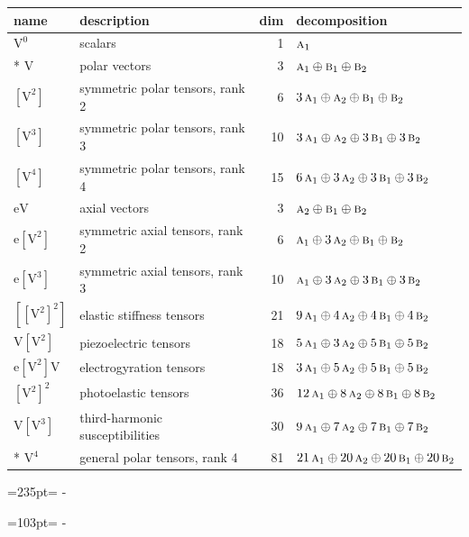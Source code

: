 \documentclass[10pt,a4paper]{article}
\newcommand{\needspace}[1]{\par\penalty-100\begingroup\dimen0=#1\relax\dimen2=\pagegoal
  \advance\dimen2-\pagetotal\ifdim\dimen0>\dimen2\relax\ifdim\dimen2>0pt\vfil\break\fi\fi
  \endgroup}
\numberwithin{equation}{section}
\newcommand{\irr}[1]{\text{\normalfont\scshape #1}}
\newcommand{\jahn}[1]{\mathrm{#1}}
\newlength{\fillwidth}\newlength{\cellwidth}\newlength{\colwidth}
\begin{document}
{\begin{longtable}{@{}llr>{\RaggedRight\arraybackslash}p{\fillwidth}@{}}
name & description & dim & decomposition\\\midrule\endhead
\bottomrule\endfoot\endlastfoot
$\jahn{V^{0}}$ & scalars & 1 & $\irr{a}_{1}$\\*
$\jahn{V}$ & polar vectors & 3 & $\irr{a}_{1} \oplus\allowbreak \irr{b}_{1} \oplus\allowbreak \irr{b}_{2}$\\
$\jahn{[V^{2}]}$ & symmetric polar tensors, rank 2 & 6 & $3\,\irr{a}_{1} \oplus\allowbreak \irr{a}_{2} \oplus\allowbreak \irr{b}_{1} \oplus\allowbreak \irr{b}_{2}$\\
$\jahn{[V^{3}]}$ & symmetric polar tensors, rank 3 & 10 & $3\,\irr{a}_{1} \oplus\allowbreak \irr{a}_{2} \oplus\allowbreak 3\,\irr{b}_{1} \oplus\allowbreak 3\,\irr{b}_{2}$\\
$\jahn{[V^{4}]}$ & symmetric polar tensors, rank 4 & 15 & $6\,\irr{a}_{1} \oplus\allowbreak 3\,\irr{a}_{2} \oplus\allowbreak 3\,\irr{b}_{1} \oplus\allowbreak 3\,\irr{b}_{2}$\\
$\jahn{eV}$ & axial vectors & 3 & $\irr{a}_{2} \oplus\allowbreak \irr{b}_{1} \oplus\allowbreak \irr{b}_{2}$\\
$\jahn{e[V^{2}]}$ & symmetric axial tensors, rank 2 & 6 & $\irr{a}_{1} \oplus\allowbreak 3\,\irr{a}_{2} \oplus\allowbreak \irr{b}_{1} \oplus\allowbreak \irr{b}_{2}$\\
$\jahn{e[V^{3}]}$ & symmetric axial tensors, rank 3 & 10 & $\irr{a}_{1} \oplus\allowbreak 3\,\irr{a}_{2} \oplus\allowbreak 3\,\irr{b}_{1} \oplus\allowbreak 3\,\irr{b}_{2}$\\
$\jahn{[[V^{2}]^{2}]}$ & elastic stiffness tensors & 21 & $9\,\irr{a}_{1} \oplus\allowbreak 4\,\irr{a}_{2} \oplus\allowbreak 4\,\irr{b}_{1} \oplus\allowbreak 4\,\irr{b}_{2}$\\
$\jahn{V[V^{2}]}$ & piezoelectric tensors & 18 & $5\,\irr{a}_{1} \oplus\allowbreak 3\,\irr{a}_{2} \oplus\allowbreak 5\,\irr{b}_{1} \oplus\allowbreak 5\,\irr{b}_{2}$\\
$\jahn{e[V^{2}]V}$ & electrogyration tensors & 18 & $3\,\irr{a}_{1} \oplus\allowbreak 5\,\irr{a}_{2} \oplus\allowbreak 5\,\irr{b}_{1} \oplus\allowbreak 5\,\irr{b}_{2}$\\
$\jahn{[V^{2}]^{2}}$ & photoelastic tensors & 36 & $12\,\irr{a}_{1} \oplus\allowbreak 8\,\irr{a}_{2} \oplus\allowbreak 8\,\irr{b}_{1} \oplus\allowbreak 8\,\irr{b}_{2}$\\
$\jahn{V[V^{3}]}$ & third-harmonic susceptibilities & 30 & $9\,\irr{a}_{1} \oplus\allowbreak 7\,\irr{a}_{2} \oplus\allowbreak 7\,\irr{b}_{1} \oplus\allowbreak 7\,\irr{b}_{2}$\\*
$\jahn{V^{4}}$ & general polar tensors, rank 4 & 81 & $21\,\irr{a}_{1} \oplus\allowbreak 20\,\irr{a}_{2} \oplus\allowbreak 20\,\irr{b}_{1} \oplus\allowbreak 20\,\irr{b}_{2}$\\
\bottomrule\end{longtable}}
\needspace{235pt}
\needspace{103pt}
\end{document}
